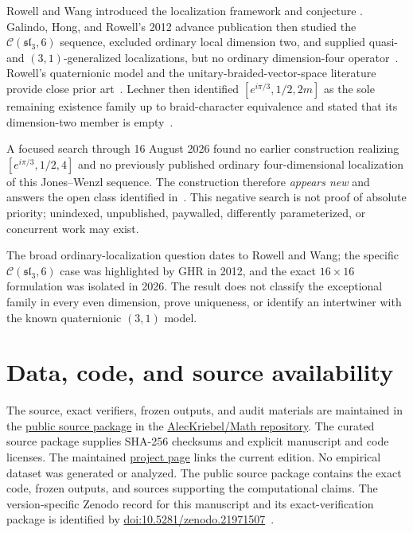 \documentclass[11pt]{article}
\theoremstyle{remark}
\newcommand{\cC}{\mathcal C}
\begin{document}
Rowell and Wang introduced the localization framework and conjecture
\cite{RowellWang2012}.  Galindo, Hong, and Rowell's 2012 advance publication
then studied the
\(\cC(\mathfrak{sl}_3,6)\) sequence, excluded ordinary local dimension two,
and supplied quasi- and \((3,1)\)-generalized localizations, but no ordinary
dimension-four operator~\cite[\S5.6]{GHR2013}.  Rowell's quaternionic model
and the unitary-braided-vector-space literature provide close prior
art~\cite{Rowell2011,GalindoRowell2014}.  Lechner then
identified \([e^{i\pi/3},1/2,2m]\) as the sole remaining existence family
up to braid-character equivalence and stated that its dimension-two member is
empty~\cite[p.~16, discussion following Proposition~3.6]{Lechner2026}.

A focused search through 16 August 2026 found no earlier construction
realizing \([e^{i\pi/3},1/2,4]\) and no previously published ordinary
four-dimensional localization of this Jones--Wenzl sequence.  The
construction therefore \emph{appears new} and answers the open class
identified in~\cite{Lechner2026}.  This negative search is not proof of
absolute priority; unindexed, unpublished, paywalled, differently
parameterized, or concurrent work may exist.

The broad ordinary-localization question dates to Rowell and Wang; the
specific \(\cC(\mathfrak{sl}_3,6)\) case was highlighted by GHR in 2012, and
the exact \(16\times16\) formulation was isolated in 2026.  The result does not
classify the exceptional family in every even dimension, prove uniqueness,
or identify an intertwiner with the known quaternionic \((3,1)\) model.

\section*{Data, code, and source availability}

The source, exact verifiers, frozen outputs, and audit materials are maintained
in the
\href{https://github.com/AlecKriebel/Math/tree/main/exceptional_ybe_d4}
{public source package} in the
\href{https://github.com/AlecKriebel/Math}{AlecKriebel/Math repository}.
The curated source package supplies SHA-256 checksums and explicit manuscript
and code licenses.  The maintained
\href{https://aleckriebel.github.io/Math/papers/exceptional-ybe-d4/}
{project page} links the current edition.  No empirical dataset was generated
or analyzed.  The public source package contains the exact code, frozen
outputs, and sources supporting the computational claims.  The~
version-specific Zenodo record for this manuscript and its exact-verification
package is identified by
\href{https://doi.org/10.5281/zenodo.21971507}
{doi:10.5281/zenodo.21971507}~\cite{Kriebel2026Zenodo}.
\end{document}
